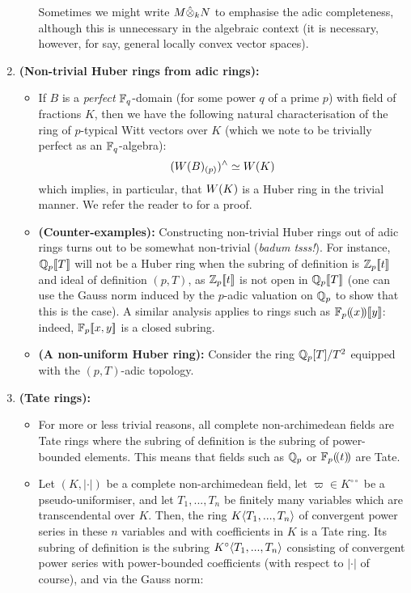 \begin{example}
\begin{enumerate}
\begin{itemize}
                            Sometimes we might write $M \hat{\tensor}_k N$ to emphasise the adic completeness, although this is unnecessary in the algebraic context (it is necessary, however, for say, general locally convex vector spaces). 
                        \end{itemize}
                    \item \textbf{(Non-trivial Huber rings from adic rings):}
                        \begin{itemize}
                            \item If $B$ is a \textit{perfect} $\mathbb{F}_q$-domain (for some power $q$ of a prime $p$) with field of fractions $K$, then we have the following natural characterisation of the ring of $p$-typical Witt vectors over $K$ (which we note to be trivially perfect as an $\mathbb{F}_q$-algebra):
                                $$(W(B)_{(p)})^{\wedge} \simeq W(K)$$
                            which implies, in particular, that $W(K)$ is a Huber ring in the trivial manner. We refer the reader to \cite[Proposition 5.2]{shimomoto2014witt} for a proof. 
                            \item \textbf{(Counter-examples):} Constructing non-trivial Huber rings out of adic rings turns out to be somewhat non-trivial (\textit{badum tsss!}). For instance, $\mathbb{Q}_p[\![T]\!]$ will not be a Huber ring when the subring of definition is $\mathbb{Z}_p[\![t]\!]$ and ideal of definition $(p, T)$, as $\mathbb{Z}_p[\![t]\!]$ is not open in $\mathbb{Q}_p[\![T]\!]$ (one can use the Gauss norm induced by the $p$-adic valuation on $\mathbb{Q}_p$ to show that this is the case). A similar analysis applies to rings such as $\mathbb{F}_p(\!(x)\!)[\![y]\!]$: indeed, $\mathbb{F}_p[\![x, y]\!]$ is a closed subring. 
                            \item \textbf{(A non-uniform Huber ring):} Consider the ring $\mathbb{Q}_p[T]/T^2$ equipped with the $(p, T)$-adic topology. 
                        \end{itemize}
                    \item \textbf{(Tate rings):} 
                        \begin{itemize}
                            \item For more or less trivial reasons, all complete non-archimedean fields are Tate rings where the subring of definition is the subring of power-bounded elements. This means that fields such as $\mathbb{Q}_p$ or $\mathbb{F}_p(\!(t)\!)$ are Tate.
                            \item Let $(K, |\cdot|)$ be a complete non-archimedean field, let $\varpi \in K^{\circ \circ}$ be a pseudo-uniformiser, and let $T_1, ..., T_n$ be finitely many variables which are transcendental over $K$. Then, the ring $K\langle T_1, ..., T_n\rangle$ of convergent power series in these $n$ variables and with coefficients in $K$ is a Tate ring. Its subring of definition is the subring $K^{\circ}\langle T_1, ..., T_n\rangle$ consisting of convergent power series with power-bounded coefficients (with respect to $|\cdot|$ of course), and via the Gauss norm:

\end{itemize}
\end{enumerate}
\end{example}
